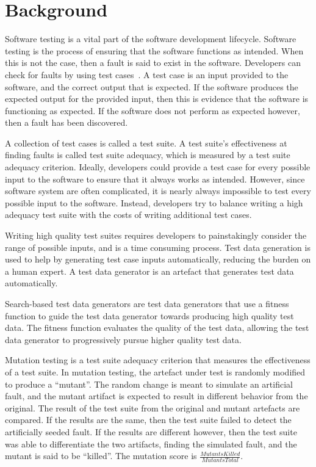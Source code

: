 \section{Background}
Software testing is a vital part of the software development lifecycle.  Software testing is the
process of ensuring that the software functions as intended.  When this is not the case, then a fault
is said to exist in the software. Developers can check for faults by using test cases~\cite{ammann2008}. A test case is
an input provided to the software, and the correct output that is expected. If the software produces
the expected output for the provided input, then this is evidence that the software is functioning as
expected.  If the software does not perform as expected however, then a fault has been discovered.

A collection of test cases is called a test suite. A test suite's effectiveness at finding faults is
called test suite adequacy, which is measured by a test suite adequacy criterion.
Ideally, developers could provide a test case for every possible input to the software to ensure
that it always works as intended. However, since
software system are often complicated, it is nearly always impossible to test every possible
input to the software. Instead, developers try to balance writing a high adequacy test suite
with the costs of writing additional test cases.

Writing high quality test suites requires developers to painstakingly consider the
range of possible inputs, and is a time consuming process. Test data generation is used to
help by generating test case inputs automatically, reducing the burden on a human expert. A test data
generator is an artefact that generates test data automatically.

Search-based test data generators are test data generators that use a fitness function to guide the
test data generator towards producing high quality test data. The fitness function evaluates the
quality of the test data, allowing the test data generator to progressively pursue higher quality test 
data.

Mutation testing is a test suite adequacy criterion that measures the effectiveness of a test suite. In
mutation testing, the artefact under test is randomly modified to produce a ``mutant''. The random
change is meant to simulate an artificial fault, and the mutant artifact is expected to result in
different behavior from the original. The result of the test suite from the original and mutant
artefacts are compared. If the results are the same, then the test suite failed to detect the
artificially seeded fault. If the results are different however, then the test suite was able to
differentiate the two artifacts, finding the simulated fault, and the mutant is said to be ``killed''.
The mutation score is $\frac{\mathit{MutantsKilled}}{\mathit{MutantsTotal}}$.

